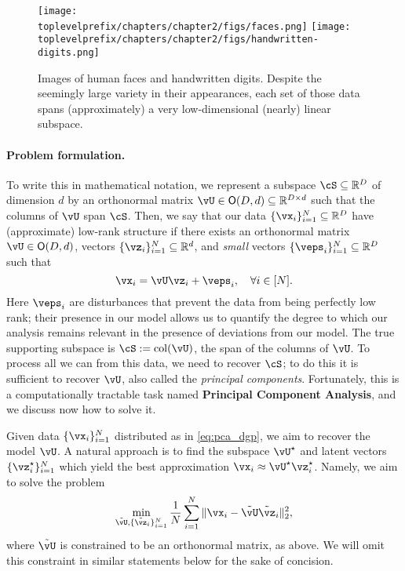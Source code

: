 \documentclass[../../book-main.tex]{subfiles}
\begin{document}
\begin{figure}
    \centering
    \texttt{[image: \\toplevelprefix/chapters/chapter2/figs/faces.png]}
    \hspace{5mm} \texttt{[image: \\toplevelprefix/chapters/chapter2/figs/handwritten-digits.png]}   
    \caption{Images of human faces and handwritten digits. Despite the seemingly large variety in their appearances, each set of those data spans (approximately) a very low-dimensional (nearly) linear subspace.}
    \label{fig:faces-digits}
\end{figure}

\paragraph{Problem formulation.}
To write this in mathematical notation, we represent a subspace \(\cS \subseteq \R^{D}\) of dimension \(d\)  by an orthonormal matrix \(\vU \in \O(D, d) \subseteq \R^{D \times d}\) such that the columns of \(\vU\) span \(\cS\). Then, we say that our data \(\{\vx_{i}\}_{i = 1}^{N} \subseteq \R^{D}\) have (approximate) low-rank structure if there exists an orthonormal matrix \(\vU \in \O(D, d)\), vectors \(\{\vz_{i}\}_{i = 1}^{N} \subseteq \R^{d}\), and \textit{small} vectors \(\{\veps_{i}\}_{i = 1}^{N} \subseteq \R^{D}\) such that 
\begin{equation}\label{eq:pca_dgp}
    \vx_{i} = \vU\vz_{i} + \veps_{i}, \quad \forall i \in [N].
\end{equation}
Here \(\veps_{i}\) are disturbances that prevent the data from being perfectly
low rank; their presence in our model allows us to quantify the degree to which
our analysis remains relevant in the presence of deviations from our model. The
true supporting subspace is \(\cS := \mathop{\mathrm{col}}(\vU)\), the span of
the columns of $\vU$. To process all we can from
this data, we need to recover \(\cS\); to do this it is sufficient to recover
\(\vU\), also called the \textit{principal components}. Fortunately, this is
a computationally tractable task named {\bf Principal Component Analysis}, and
we discuss now how to solve it.

Given data \(\{\vx_{i}\}_{i = 1}^{N}\) distributed as in \eqref{eq:pca_dgp}, we
aim to recover the model \(\vU\). A natural approach is to find the subspace
\(\vU^{\star}\) and latent vectors \(\{\vz_{i}^{\star}\}_{i = 1}^{N}\) which
yield the best approximation \(\vx_{i} \approx \vU^{\star}\vz_{i}^{\star}\). Namely, we aim to solve the problem 
\begin{equation}\label{eq:pca_sparse_recovery_problem}
    \min_{\tilde{\vU}, \{\tilde{\vz}_{i}\}_{i = 1}^{N}}\frac{1}{N}\sum_{i = 1}^{N}\norm{\vx_{i} - \tilde{\vU}\tilde{\vz}_{i}}_{2}^{2},
\end{equation}
where $\tilde{\vU}$ is constrained to be an orthonormal matrix, as above. We will omit
this constraint in similar statements below for the sake of concision.
\end{document}
